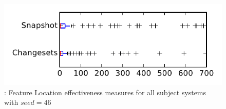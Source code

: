 
\begin{figure}
\centering
\includegraphics[height=0.4\textheight]{figures/flt_seed/rq1_tiny_46}
\caption{\rone: Feature Location effectiveness measures for all subject systems with $seed=46$}
\label{fig:flt_seed:rq1:tiny}
\end{figure}
